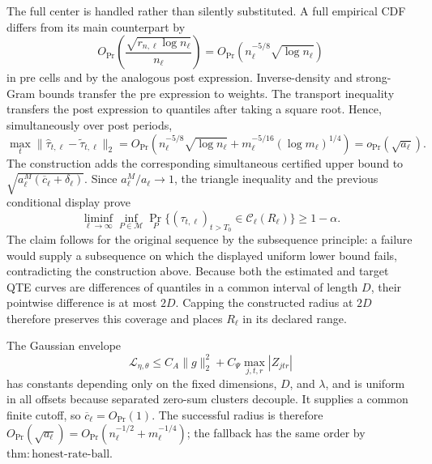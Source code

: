 The full center is handled rather than silently substituted.  A full empirical CDF differs from its main counterpart by
\[
 O_{\Pr}\left(\frac{\sqrt{r_{n,\ell}\log n_\ell}}{n_\ell}\right)
 =O_{\Pr}(n_\ell^{-5/8}\sqrt{\log n_\ell})
\]
in pre cells and by the analogous post expression.  Inverse-density and strong-Gram bounds transfer the pre expression to weights.  The transport inequality transfers the post expression to quantiles after taking a square root.  Hence, simultaneously over post periods,
\[
 \max_t\|\widehat\tau_{t,\ell}-\widetilde\tau_{t,\ell}\|_2
 =O_{\Pr}\left(n_\ell^{-5/8}\sqrt{\log n_\ell}
 +m_\ell^{-5/16}(\log m_\ell)^{1/4}\right)
 =o_{\Pr}(\sqrt{a_\ell}).
\]
The construction adds the corresponding simultaneous certified upper bound to
\(\sqrt{a^M_\ell(\overline c_\ell+\delta_\ell)}\).  Since
\(a^M_\ell/a_\ell\to1\), the triangle inequality and the previous conditional display prove
\[
 \liminf_{\ell\to\infty}\inf_{P\in\mathcal M}
 \Pr_P\{(\tau_{t,\ell})_{t>T_0}\in\mathcal C_\ell(R_\ell)\}
 \geq1-\alpha.
\]
The claim follows for the original sequence by the subsequence principle: a failure would supply a subsequence on which the displayed uniform lower bound fails, contradicting the construction above.
Because both the estimated and target QTE curves are differences of quantiles in a common interval of length \(D\), their pointwise difference is at most \(2D\).  Capping the constructed radius at \(2D\) therefore preserves this coverage and places \(R_\ell\) in its declared range.

The Gaussian envelope
\[
 \mathcal L_{\eta,\theta}
 \leq C_A\|g\|_2^2+C_\Psi\max_{j,t,r}|Z_{jtr}|
\]
has constants depending only on the fixed dimensions, \(D\), and \(\lambda\), and is uniform in all offsets because separated zero-sum clusters decouple.  It supplies a common finite cutoff, so \(\overline c_\ell=O_{\Pr}(1)\).  The successful radius is therefore
\(O_{\Pr}(\sqrt{a_\ell})=O_{\Pr}(n_\ell^{-1/2}+m_\ell^{-1/4})\); the fallback has the same order by
\(\mathrm{thm:honest\mbox{-}rate\mbox{-}ball}\).

